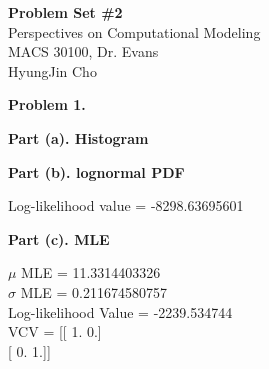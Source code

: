 \documentclass[letterpaper,12pt]{article}
\theoremstyle{definition}
\begin{document}
\begin{flushleft}
  \textbf{\large{Problem Set \#2}} \\
  Perspectives on Computational Modeling \\
  MACS 30100, Dr. Evans \\
  HyungJin Cho
\end{flushleft}

\vspace{5mm}

\begin{enumerate}
  \textbf{Problem 1.}
\end {enumerate}
\begin{enumerate}
  \textbf{Part (a). Histogram}
\par
\begin{figure}[H]\centering\captionsetup{width=4.0in}
\end{figure}
\par\bigskip
\end {enumerate}

\begin{enumerate}
  \textbf{Part (b). lognormal PDF}
\par
\begin{figure}[H]\centering\captionsetup{width=4.0in}
\end{figure}
\par
Log-likelihood value = -8298.63695601
\par\bigskip
\end {enumerate}

\begin{enumerate}
  \textbf{Part (c). MLE}
\par
\begin{figure}[H]\centering\captionsetup{width=4.0in}
\end{figure}
\par
$\mu$ MLE = 11.3314403326 \\
$\sigma$ MLE = 0.211674580757 \\
Log-likelihood Value = -2239.534744 \\
VCV =  [[ 1.  0.] \\
\hspace{12mm} [ 0.  1.]]
\par\bigskip
\end {enumerate}
\end{document}
